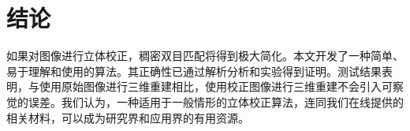 \section{结论}
\label{sec:conclusion}

如果对图像进行立体校正，稠密双目匹配将得到极大简化。本文开发了一种简单、易于理解和使用的算法。其正确性已通过解析分析和实验得到证明。测试结果表明，与使用原始图像进行三维重建相比，使用校正图像进行三维重建不会引入可察觉的误差。我们认为，一种适用于一般情形的立体校正算法，连同我们在线提供的相关材料，可以成为研究界和应用界的有用资源。

